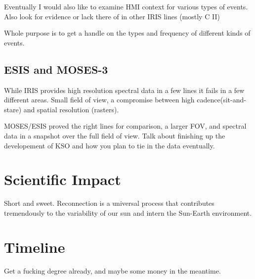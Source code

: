 \documentclass[]{aastex6}
\begin{document}
	Eventually I would also like to examine HMI context for various types of events.  Also look for evidence or lack there of in other IRIS lines (mostly C II)
	
	Whole purpose is to get a handle on the types and frequency of different kinds of events.
	\subsection{ESIS and MOSES-3}
	While IRIS provides high resolution spectral data in a few lines it fails in a few different areas.  Small field of view, a compromise between high cadence(sit-and-stare) and spatial resolution (rasters).  
	
	MOSES/ESIS proved the right lines for comparison, a larger FOV, and spectral data in a snapshot over the full field of view.  Talk about finishing up the developement of KSO and how you plan to tie in the data eventually.


\section{Scientific Impact}
%
Short and sweet.  Reconnection is a universal process that contributes tremendously to the variability of our sun and intern the Sun-Earth environment.

 
\section{Timeline}
Get a fucking degree already, and maybe some money in the meantime.





	
\end{document}
